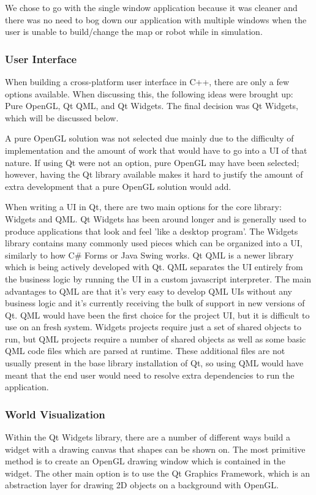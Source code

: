 We chose to go with the single window application because it was cleaner and there was no need to bog down our application with multiple windows when the user is unable to build/change the map or robot while in simulation.  
 
 
 \subsubsection*{User Interface}
 	When building a cross-platform user interface in C++, there are only a few options available. When discussing this, the following ideas were brought up: Pure OpenGL, Qt QML, and Qt Widgets. The final decision was Qt Widgets, which will be discussed below.
 	
 	A pure OpenGL solution was not selected due mainly due to the difficulty of implementation and the amount of work that would have to go into a UI of that nature. If using Qt were not an option, pure OpenGL may have been selected; however, having the Qt library available makes it hard to justify the amount of extra development that a pure OpenGL solution would add.
 	
 	When writing a UI in Qt, there are two main options for the core library: Widgets and QML. Qt Widgets has been around longer and is generally used to produce applications that look and feel 'like a desktop program'. The Widgets library contains many commonly used pieces which can be organized into a UI, similarly to how C\# Forms or Java Swing works. Qt QML is a newer library which is being actively developed with Qt. QML separates the UI entirely from the business logic by running the UI in a custom javascript interpreter. The main advantages to QML are that it's very easy to develop QML UIs without any business logic and it's currently receiving the bulk of support in new versions of Qt. QML would have been the first choice for the project UI, but it is difficult to use on an fresh system. Widgets projects require just a set of shared objects to run, but QML projects require a number of shared objects as well as some basic QML code files which are parsed at runtime. These additional files are not usually present in the base library installation of Qt, so using QML would have meant that the end user would need to resolve extra dependencies to run the application.
 	
 	\subsubsection*{World Visualization}
 	Within the Qt Widgets library, there are a number of different ways build a widget with a drawing canvas that shapes can be shown on. The most primitive method is to create an OpenGL drawing window which is contained in the widget. The other main option is to use the Qt Graphics Framework, which is an abstraction layer for drawing 2D objects on a background with OpenGL.
 	
